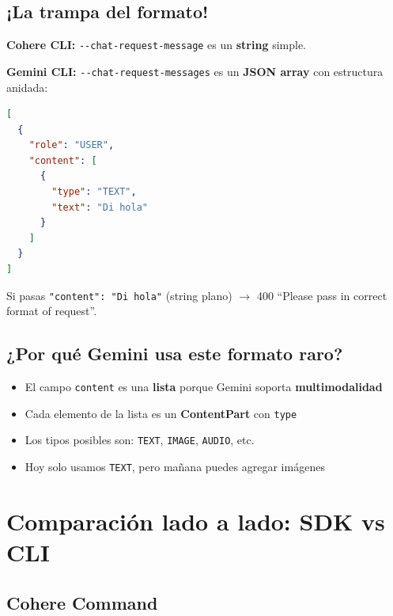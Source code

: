 \documentclass[11pt,a4paper,oneside]{article}
\begin{document}
\subsection{¡La trampa del formato!}

\begin{tcolorbox}[colback=warnorange!5!white,colframe=warnorange,title={Diferencia clave Cohere vs Gemini}]
\textbf{Cohere CLI:} \texttt{-{}-chat-request-message} es un \textbf{string} simple.

\textbf{Gemini CLI:} \texttt{-{}-chat-request-messages} es un \textbf{JSON array} con estructura anidada:

\begin{lstlisting}[language=json]
[
  {
    "role": "USER",
    "content": [
      {
        "type": "TEXT",
        "text": "Di hola"
      }
    ]
  }
]
\end{lstlisting}

Si pasas \texttt{"content": "Di hola"} (string plano) $\rightarrow$ 400 ``Please pass in correct format of request''.
\end{tcolorbox}

\subsection{¿Por qué Gemini usa este formato raro?}

\begin{itemize}
  \item El campo \texttt{content} es una \textbf{lista} porque Gemini soporta \textbf{multimodalidad}
  \item Cada elemento de la lista es un \textbf{ContentPart} con \texttt{type}
  \item Los tipos posibles son: \texttt{TEXT}, \texttt{IMAGE}, \texttt{AUDIO}, etc.
  \item Hoy solo usamos \texttt{TEXT}, pero mañana puedes agregar imágenes
\end{itemize}

\section{Comparación lado a lado: SDK vs CLI}

\subsection{Cohere Command}
\end{document}
